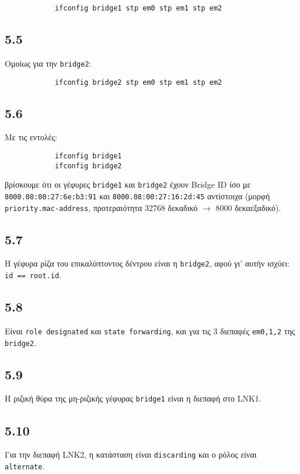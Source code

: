 \documentclass[a4paper, 12pt]{article}
\begin{document}
		\begin{verbatim}
			ifconfig bridge1 stp em0 stp em1 stp em2
		\end{verbatim}

	\subsection*{5.5}
		Ομοίως για την \verb|bridge2|:
		
		\begin{verbatim}
			ifconfig bridge2 stp em0 stp em1 stp em2
		\end{verbatim}

	\subsection*{5.6}
		Με τις εντολές: 
		
		\begin{verbatim}
			ifconfig bridge1
			ifconfig bridge2
		\end{verbatim}
				
		βρίσκουμε ότι οι γέφυρες \verb|bridge1| και \verb|bridge2| έχουν Bridge ID ίσο με \verb|8000.08:00:27:6e:b3:91| και \verb|8000.08:00:27:16:2d:45| αντίστοιχα (μορφή \verb|priority.mac-address|, προτεραιότητα 32768 δεκαδικό $\rightarrow$ 8000 δεκαεξαδικό). 

	\subsection*{5.7}
		Η γέφυρα ρίζα του επικαλύπτοντος δέντρου είναι η \verb|bridge2|, αφού γι' αυτήν ισχύει: \verb|id == root.id|.

	\subsection*{5.8}
		Είναι \verb|role designated| και \verb|state forwarding|, και για τις 3 διεπαφές \verb|em0,1,2| της \verb|bridge2|.

	\subsection*{5.9}
		Η ριζική θύρα της μη-ριζικής γέφυρας \verb|bridge1| είναι η διεπαφή στο LNK1.

	\subsection*{5.10}
		Για την διεπαφή LNK2, η κατάσταση είναι \verb|discarding| και ο ρόλος είναι \verb|alternate|.
\end{document}
